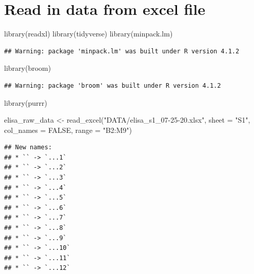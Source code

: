 \documentclass[
]{book}
\newenvironment{Shaded}{\begin{snugshade}}{\end{snugshade}}
\newcommand{\AttributeTok}[1]{\textcolor[rgb]{0.77,0.63,0.00}{#1}}
\newcommand{\ConstantTok}[1]{\textcolor[rgb]{0.00,0.00,0.00}{#1}}
\newcommand{\FunctionTok}[1]{\textcolor[rgb]{0.00,0.00,0.00}{#1}}
\newcommand{\NormalTok}[1]{#1}
\newcommand{\OtherTok}[1]{\textcolor[rgb]{0.56,0.35,0.01}{#1}}
\newcommand{\StringTok}[1]{\textcolor[rgb]{0.31,0.60,0.02}{#1}}
\begin{document}
\hypertarget{read-in-data-from-excel-file}{%
\section{Read in data from excel file}\label{read-in-data-from-excel-file}}

\begin{Shaded}
\begin{Highlighting}[]
\FunctionTok{library}\NormalTok{(readxl)}
\FunctionTok{library}\NormalTok{(tidyverse)}
\FunctionTok{library}\NormalTok{(minpack.lm)}
\end{Highlighting}
\end{Shaded}

\begin{verbatim}
## Warning: package 'minpack.lm' was built under R version 4.1.2
\end{verbatim}

\begin{Shaded}
\begin{Highlighting}[]
\FunctionTok{library}\NormalTok{(broom)}
\end{Highlighting}
\end{Shaded}

\begin{verbatim}
## Warning: package 'broom' was built under R version 4.1.2
\end{verbatim}

\begin{Shaded}
\begin{Highlighting}[]
\FunctionTok{library}\NormalTok{(purrr)}
\end{Highlighting}
\end{Shaded}

\begin{Shaded}
\begin{Highlighting}[]
\NormalTok{elisa\_raw\_data }\OtherTok{\textless{}{-}} \FunctionTok{read\_excel}\NormalTok{(}\StringTok{"DATA/elisa\_s1\_07{-}25{-}20.xlsx"}\NormalTok{, }\AttributeTok{sheet =} \StringTok{"S1"}\NormalTok{, }\AttributeTok{col\_names =} \ConstantTok{FALSE}\NormalTok{,  }\AttributeTok{range =} \StringTok{"B2:M9"}\NormalTok{)}
\end{Highlighting}
\end{Shaded}

\begin{verbatim}
## New names:
## * `` -> `...1`
## * `` -> `...2`
## * `` -> `...3`
## * `` -> `...4`
## * `` -> `...5`
## * `` -> `...6`
## * `` -> `...7`
## * `` -> `...8`
## * `` -> `...9`
## * `` -> `...10`
## * `` -> `...11`
## * `` -> `...12`
\end{verbatim}
\end{document}

